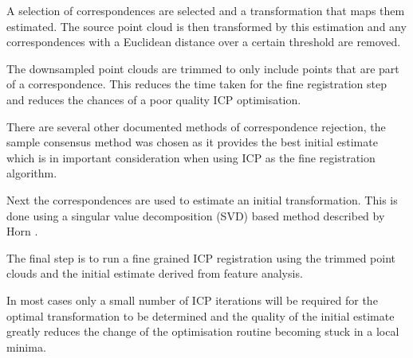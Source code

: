 \documentclass{entcs}
\begin{document}
A selection of correspondences are selected and a transformation that maps them
estimated. The source point cloud is then transformed by this estimation and any
correspondences with a Euclidean distance over a certain threshold are removed.

The downsampled point clouds are trimmed to only include points that are part of
a correspondence. This reduces the time taken for the fine registration step and
reduces the chances of a poor quality ICP optimisation.

There are several other documented methods of correspondence rejection, the
sample consensus method was chosen as it provides the best initial estimate
which is in important consideration when using ICP as the fine registration
algorithm. \cite{Holz2015}

Next the correspondences are used to estimate an initial transformation.
This is done using a singular value decomposition (SVD) based method described
by Horn \cite{Horn1987}.

The final step is to run a fine grained ICP registration using the trimmed point
clouds and the initial estimate derived from feature analysis.

In most cases only a small number of ICP iterations will be required for the
optimal transformation to be determined and the quality of the initial estimate
greatly reduces the change of the optimisation routine becoming stuck in a local
minima.
\end{document}
